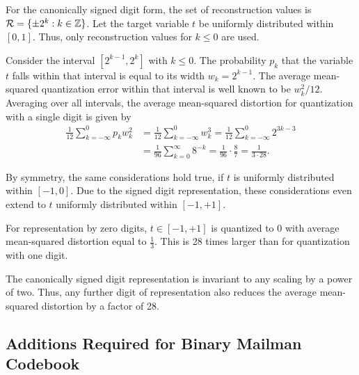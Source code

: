 \documentclass[twocolumn]{IEEEtran}
\begin{document}
For the canonically signed digit form, the set of reconstruction values is ${\cal R} = \{\pm 2^k: k\in \mathbb{Z}\}$. 
Let the target variable $t$ be uniformly distributed within $[0,1]$.
Thus, only reconstruction values for $k\le 0$ are used.

Consider the interval $[2^{k-1},2^k]$ with $k\le0$. The probability $p_k$ that the variable $t$ falls within that interval is equal to its width $w_k=2^{k-1}$.
The average mean-squared quantization error within that interval is well known to be $w_k^2/12$. Averaging over all intervals, the average mean-squared distortion for quantization with a single digit is given by
\begin{align}
 \frac1{12} \sum\limits_{k=-\infty}^0 p_k w_k^2 &= \frac 1{12} \sum\limits_{k=-\infty}^0 w_k^3 = \frac 1{12} \sum\limits_{k=-\infty}^0 2^{3k-3}\\
& = \frac1{96}  \sum\limits_{k=0}^\infty 8^{-k} = \frac 1{96} \cdot \frac 87=\frac1{3\cdot 28}.
\end{align}

By symmetry, the same considerations hold true, if $t$ is uniformly distributed within $[-1,0]$. Due to the signed digit representation, these considerations even extend to $t$ uniformly distributed within $[-1,+1]$.  

For representation by zero digits, $t\in[-1,+1]$ is quantized to 0 with average mean-squared distortion equal to $\frac13$. This is 28 times larger than for quantization with one digit.

The canonically signed digit representation is invariant to any scaling by a power of two. Thus, any further digit of representation also reduces the average mean-squared distortion by a factor of 28.

\subsection*{Additions Required for Binary Mailman Codebook}
\end{document}

